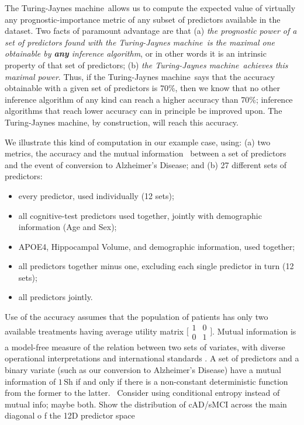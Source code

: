 \documentclass[utf8]{FrontiersinHarvard} %
\newcommand*{\wrench}{{\fontencoding{U}\fontfamily{fontawesomethree}\selectfont\symbol{114}}}
\newcommand{\mynotew}[1]{{\color{notecolour}\wrench\ #1}}
\renewcommand*{\|}[1][]{\nonscript\:#1\vert\nonscript\:\mathopen{}}
\newcommand*{\ad}{Alzheimer's Disease}
\newcommand*{\tjm}{Turing-Jaynes machine}
\begin{document}
The \tjm\ allows us to compute the expected value of virtually any prognostic-importance metric of any subset of predictors available in the dataset. Two facts of paramount advantage are that (a) \emph{the prognostic power of a set of predictors found with the \tjm\ is the maximal one obtainable by \textbf{any} inference algorithm}, or in other words it is an intrinsic property of that set of predictors; (b) \emph{the \tjm\ achieves this maximal power}. Thus, if the \tjm\ says that the accuracy obtainable with a given set of predictors is 70\%, then we know that no other inference algorithm of any kind can reach a higher accuracy than 70\%; inference algorithms that reach lower accuracy can in principle be improved upon. The \tjm, by construction, will reach this accuracy.

We illustrate this kind of computation in our example case, using: (a) two metrics, the accuracy and the mutual information~\citep{shannon1948,coveretal1991_r2006} between a set of predictors and the event of conversion to \ad; and (b) 27 different sets of predictors:
\begin{itemize}
\item every predictor, used individually (12 sets);
\item all cognitive-test predictors used together, jointly with demographic information (Age and Sex);
\item APOE4, Hippocampal Volume, and demographic information, used together;
\item all predictors together minus one, excluding each single predictor in turn (12 sets);
\item all predictors jointly.
\end{itemize}

Use of the accuracy assumes that the population of patients has only two available treatments having average utility matrix $\bigl[\begin{smallmatrix}1&0\\0&1\end{smallmatrix}\bigr]$. Mutual information is a model-free measure of the relation between two sets of variates, with diverse operational interpretations \citep{mackay1995_r2005,woodward1953_r1964,minka1998d_r2003,goodetal1968,kelly1956,kullback1959_r1978} and international standards \citep{iso2008c}. A set of predictors and a binary variate (such as our conversion to \ad) have a mutual information of $1\,\mathrm{Sh}$ if and only if there is a non-constant deterministic function from the former to the latter. \mynotew{Consider using conditional entropy instead of mutual info; maybe both. Show the distribution of cAD/sMCI across the main diagonal o f the 12D predictor space}
\end{document}
